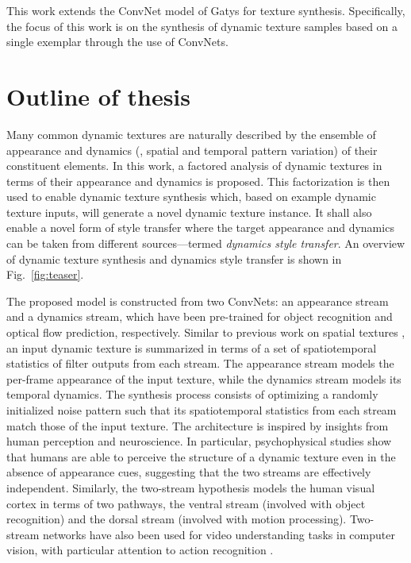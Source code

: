 This work extends the ConvNet model of Gatys \etal \cite{gatys2016image} for texture synthesis. Specifically, the focus of this work is on the synthesis of dynamic texture 
samples based on a single exemplar through the use of ConvNets.

\section{Outline of thesis}

Many common dynamic textures are naturally described by the ensemble of 
appearance and dynamics (\ie, spatial and temporal pattern variation) of their 
constituent elements. In this work, a factored analysis of dynamic 
textures in terms of their appearance and dynamics is proposed.
This factorization is then used to enable dynamic texture synthesis
which, based on example dynamic texture inputs, will generate a novel dynamic
texture instance.
It shall also enable a novel form of style transfer where the 
target appearance and dynamics can be taken from different sources---termed \emph{dynamics style transfer}.
An overview of dynamic texture synthesis and dynamics style transfer
is shown in Fig.\ \ref{fig:teaser}.



The proposed model is constructed from two ConvNets: an appearance stream and a dynamics stream,
which have been pre-trained for object recognition
and optical flow prediction, respectively.
Similar to previous work on spatial textures
\cite{gatys2015,heeger1995pyramid,portilla2000parametric}, an input dynamic texture is summarized in terms of a set of
spatiotemporal statistics of filter outputs from each stream.
The appearance stream models the per-frame appearance of
the input texture, while the dynamics stream models its
temporal dynamics.
The synthesis process consists of optimizing a randomly initialized noise pattern such that its spatiotemporal statistics from
each stream match those of the input texture.
The architecture is inspired by insights from human perception and 
neuroscience.
In particular, psychophysical studies \cite{cutting1982} show that
humans are able to perceive the structure of a dynamic texture even
in the absence of appearance cues, suggesting that the two streams
are effectively independent.
Similarly, the two-stream hypothesis \cite{goodale1992} models the 
human visual cortex in terms of two pathways, the ventral stream
(involved with object recognition) and the
dorsal stream (involved with motion processing). Two-stream networks have also been used for video understanding tasks in computer vision, with particular attention to action recognition \cite{simonyan2014,feichtenhofer2016two}.

